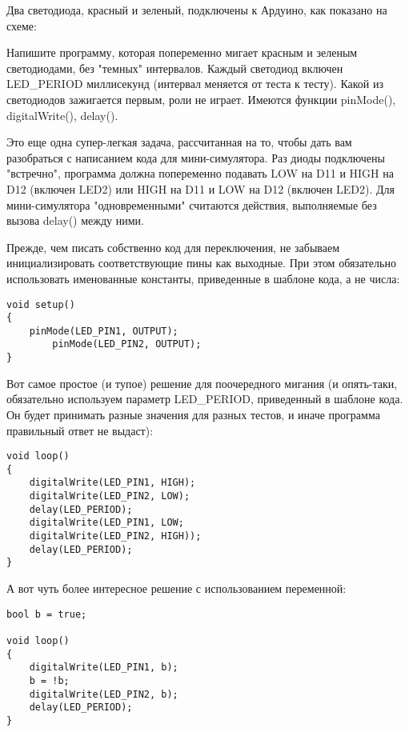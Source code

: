 
Два светодиода, красный и зеленый, подключены к Ардуино, как показано на схеме:


Напишите программу, которая попеременно мигает красным и зеленым светодиодами, без "темных" 
интервалов.  Каждый светодиод включен LED\_PERIOD миллисекунд (интервал меняется от теста к тесту).  
Какой из светодиодов зажигается первым,  роли не играет.  Имеются функции  pinMode(), 
digitalWrite(), delay().  

\solutionSection

Это еще одна супер-легкая задача, рассчитанная на то, чтобы дать вам разобраться с написанием кода для мини-симулятора.  Раз диоды подключены "встречно", программа должна попеременно подавать LOW на D11 и HIGH на D12 (включен LED2) или  HIGH на D11 и LOW на D12 (включен LED2).  Для мини-симулятора "одновременными" считаются действия, выполняемые без вызова delay() между ними.  

Прежде, чем писать собственно код для переключения, не забываем инициализировать соответствующие пины как выходные.  При этом обязательно использовать именованные константы, приведенные в шаблоне кода,  а не числа:

\begin{verbatim}
void setup()
{
    pinMode(LED_PIN1, OUTPUT);
        pinMode(LED_PIN2, OUTPUT);
}        
\end{verbatim}

Вот самое простое (и тупое) решение для поочередного мигания (и опять-таки, обязательно используем параметр LED\_PERIOD, приведенный в шаблоне кода. Он будет принимать разные значения для разных тестов, и иначе программа правильный ответ не выдаст):

\begin{verbatim}
void loop()
{
    digitalWrite(LED_PIN1, HIGH);
    digitalWrite(LED_PIN2, LOW);
    delay(LED_PERIOD); 
    digitalWrite(LED_PIN1, LOW;
    digitalWrite(LED_PIN2, HIGH));
    delay(LED_PERIOD); 
}            
\end{verbatim}

А вот чуть более интересное решение с использованием переменной:

\begin{verbatim}
bool b = true;

void loop()
{
    digitalWrite(LED_PIN1, b);
    b = !b;
    digitalWrite(LED_PIN2, b);
    delay(LED_PERIOD); 
}
\end{verbatim}

